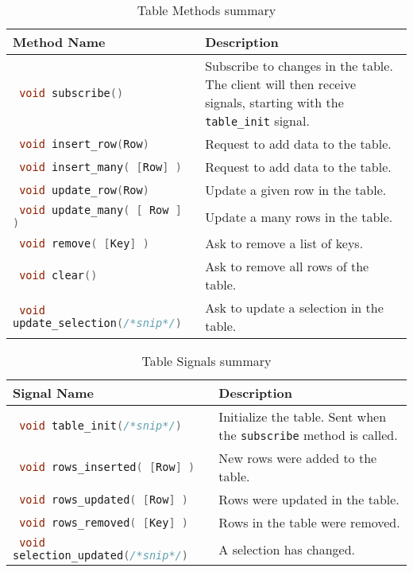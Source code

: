\documentclass[11pt, oneside]{amsart}
\begin{document}
\begin{table}
	\begin{tabularx}{.9\textwidth}{p{2.25in}X}
		\toprule
		Method Name & Description \\
		\midrule
		\lstinline[language=c++]| void subscribe() |
		&
		Subscribe to changes in the table. The client will then receive signals, starting with the \texttt{table\_init} signal.
		\\
		\lstinline[language=c++]| void insert_row(Row) |
		&
		Request to add data to the table.
		\\
		\lstinline[language=c++]| void insert_many( [Row] ) |
		&
		Request to add data to the table.
		\\
		\lstinline[language=c++]| void update_row(Row) |
		&
		Update a given row in the table.
		\\
		\lstinline[language=c++]| void update_many( [ Row ]  ) |
		&
		Update a many rows in the table.
		\\
		\lstinline[language=c++]| void remove( [Key] ) |
		&
		Ask to remove a list of keys.
		\\
		\lstinline[language=c++]| void clear() |
		&
		Ask to remove all rows of the table.
		\\
		\lstinline[language=c++]| void update_selection(/*snip*/) |
		&
		Ask to update a selection in the table.
		\\
		\bottomrule
	\end{tabularx}
	\caption{Table Methods summary}
	\label{tbl:table_methods}
\end{table}

\begin{table}
	\begin{tabularx}{.9\textwidth}{p{2.25in}X}
		\toprule
		Signal Name & Description \\
		\midrule
		\lstinline[language=c++]| void table_init(/*snip*/) |
		&
		Initialize the table. Sent when the \texttt{subscribe} method is called.
		\\
		\lstinline[language=c++]| void rows_inserted( [Row] ) |
		&
		New rows were added to the table.
		\\
		\lstinline[language=c++]| void rows_updated( [Row] ) |
		&
		Rows were updated in the table.
		\\
		\lstinline[language=c++]| void rows_removed( [Key] ) |
		&
		Rows in the table were removed.
		\\
		\lstinline[language=c++]| void selection_updated(/*snip*/) |
		&
		A selection has changed.
		\\
		\bottomrule
	\end{tabularx}
	\caption{Table Signals summary}
	\label{tbl:table_signals}
\end{table}
\end{document}
